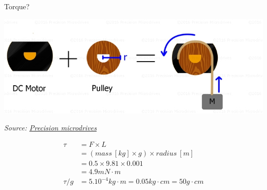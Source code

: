 \documentclass[compress]{beamer}
\newcommand{\source}[2]{{\tiny\it Source: \href{#1}{#2}}}
\begin{document}
\begin{frame}{Torque?}

    \begin{center}

        \includegraphics[width=0.8\linewidth]{torque-dc-motor}

        \source{https://www.precisionmicrodrives.com/tech-blog/2013/09/23/torque-calculations-gearmotor-applications}{Precision
        microdrives}

\begin{align*}
   \tau &= F \times L \\
        &= (mass \: [kg] \times g) \times radius \: [m] \\
        &= 0.5 \times 9.81 \times 0.001 \\
        &= 4.9 mN\cdot m \\
    \tau / g    &= 5 . 10^{-4} kg\cdot m = 0.05 kg\cdot cm = 50 g\cdot cm
\end{align*}

    \end{center}
\end{frame}
\end{document}
